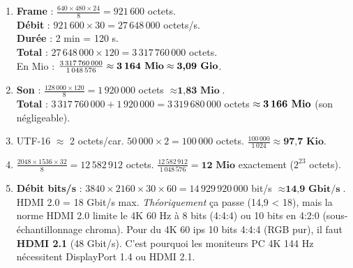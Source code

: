 \documentclass[11pt]{article}
\begin{document}
\begin{corrige}[Exercices]
\begin{enumerate}
  \item \textbf{Frame} : $\frac{640 \times 480 \times 24}{8} = 921\,600$ octets. \\
        \textbf{Débit} : $921\,600 \times 30 = 27\,648\,000$ octets/s. \\
        \textbf{Durée} : 2 min = 120 s. \\
        \textbf{Total} : $27\,648\,000 \times 120 = 3\,317\,760\,000$ octets. \\
        En Mio : $\frac{3\,317\,760\,000}{1\,048\,576} \approx \textbf{3\,164 Mio} \approx \textbf{3,09 Gio}$.
  \item \textbf{Son} : $\frac{128\,000 \times 120}{8} = 1\,920\,000$ octets $\approx \textbf{1,83 Mio}$. \\
        \textbf{Total} : $3\,317\,760\,000 + 1\,920\,000 = 3\,319\,680\,000$ octets $\approx \textbf{3\,166 Mio}$ (son négligeable).
  \item UTF-16 $\approx$ 2 octets/car. $50\,000 \times 2 = 100\,000$ octets. $\frac{100\,000}{1\,024} \approx \textbf{97,7 Kio}$.
  \item $\frac{2048 \times 1536 \times 32}{8} = 12\,582\,912$ octets. $\frac{12\,582\,912}{1\,048\,576} = \textbf{12 Mio}$ exactement ($2^{23}$ octets).
  \item \textbf{Débit bits/s} : $3840 \times 2160 \times 30 \times 60 = 14\,929\,920\,000$ bit/s $\approx \textbf{14,9 Gbit/s}$. \\
        HDMI 2.0 = 18 Gbit/s max. \emph{Théoriquement} ça passe (14,9 < 18), mais la norme HDMI 2.0 limite le 4K 60 Hz à 8 bits (4:4:4) ou 10 bits en 4:2:0 (sous-échantillonnage chroma). Pour du 4K 60 ips 10 bits 4:4:4 (RGB pur), il faut \textbf{HDMI 2.1} (48 Gbit/s). C'est pourquoi les moniteurs PC 4K 144 Hz nécessitent DisplayPort 1.4 ou HDMI 2.1.
\end{enumerate}
\end{corrige}
\end{document}
